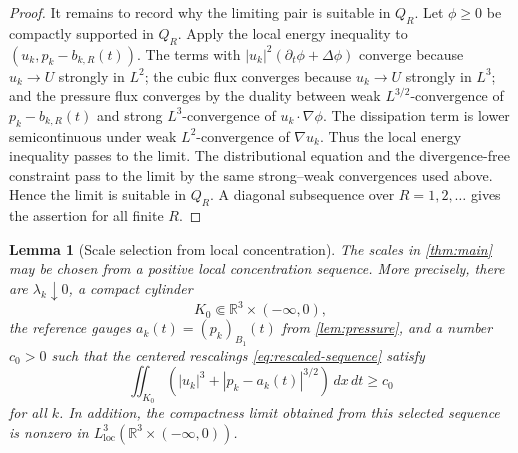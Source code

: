 \documentclass[11pt]{amsart}
\theoremstyle{plain}
\newtheorem{lemma}[theorem]{Lemma}
\theoremstyle{definition}
\theoremstyle{remark}
\numberwithin{equation}{section}
\newcommand{\R}{\mathbb R}
\newcommand{\loc}{\mathrm{loc}}
\begin{document}
\begin{proof}
It remains to record why the limiting pair is suitable in \(Q_R\).  Let
\(\phi\ge0\) be compactly supported in \(Q_R\).  Apply the local energy
inequality to \((u_k,p_k-b_{k,R}(t))\).  The terms with
\(|u_k|^2(\partial_t\phi+\Delta\phi)\) converge because
\(u_k\to U\) strongly in \(L^2\); the cubic flux converges because
\(u_k\to U\) strongly in \(L^3\); and the pressure flux converges by the
duality between weak \(L^{3/2}\)-convergence of \(p_k-b_{k,R}(t)\) and strong
\(L^3\)-convergence of \(u_k\cdot\nabla\phi\).  The dissipation term is lower
semicontinuous under weak \(L^2\)-convergence of \(\nabla u_k\).  Thus the
local energy inequality passes to the limit.  The distributional equation and
the divergence-free constraint pass to the limit by the same strong--weak
convergences used above.  Hence the limit is suitable in \(Q_R\).  A diagonal
subsequence over \(R=1,2,\ldots\) gives the assertion for all finite \(R\).
\end{proof}

\begin{lemma}[Scale selection from local concentration]\label{lem:scale-selection}
The scales in \cref{thm:main} may be chosen from a positive local
concentration sequence.  More precisely, there are
\(\lambda_k\downarrow0\), a compact cylinder
\[
   K_0\Subset \R^3\times(-\infty,0),
\]
the reference gauges \(a_k(t)=(p_k)_{B_1}(t)\) from
\cref{lem:pressure}, and a number \(c_0>0\) such that the centered
rescalings \eqref{eq:rescaled-sequence} satisfy
\begin{equation}\label{eq:selected-lower-bound}
   \iint_{K_0}
   \left(|u_k|^3+|p_k-a_k(t)|^{3/2}\right)\,dx\,dt\ge c_0
\end{equation}
for all \(k\).  In addition, the compactness limit obtained from this selected
sequence is nonzero in \(L^3_{\loc}(\R^3\times(-\infty,0))\).
\end{lemma}
\end{document}

